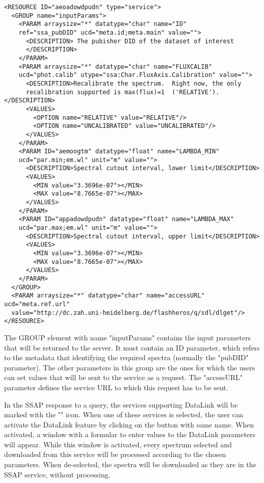 \documentclass[final,authoryear,5p,times,twocolumn]{elsarticle}
\begin{document}
\begin{itemize}
{\tiny
\begin{minipage}{\textwidth} 
\begin{verbatim}
<RESOURCE ID="aeoadowdpudn" type="service">
  <GROUP name="inputParams">
    <PARAM arraysize="*" datatype="char" name="ID" 
    ref="ssa_pubDID" ucd="meta.id;meta.main" value="">
      <DESCRIPTION> The pubisher DID of the dataset of interest
      </DESCRIPTION>
    </PARAM>
    <PARAM arraysize="*" datatype="char" name="FLUXCALIB" 
    ucd="phot.calib" utype="ssa:Char.FluxAxis.Calibration" value="">
      <DESCRIPTION>Recalibrate the spectrum.  Right now, the only 
      recalibration supported is max(flux)=1  ('RELATIVE').</DESCRIPTION>
      <VALUES>
        <OPTION name="RELATIVE" value="RELATIVE"/>
        <OPTION name="UNCALIBRATED" value="UNCALIBRATED"/>
      </VALUES>
    </PARAM>
    <PARAM ID="aemoogtm" datatype="float" name="LAMBDA_MIN"
    ucd="par.min;em.wl" unit="m" value="">
      <DESCRIPTION>Spectral cutout interval, lower limit</DESCRIPTION>
      <VALUES>
        <MIN value="3.3696e-07"></MIN>
        <MAX value="8.7665e-07"></MAX>
      </VALUES>
    </PARAM>
    <PARAM ID="appadowdpudn" datatype="float" name="LAMBDA_MAX" 
    ucd="par.max;em.wl" unit="m" value="">
      <DESCRIPTION>Spectral cutout interval, upper limit</DESCRIPTION>
      <VALUES>
        <MIN value="3.3696e-07"></MIN>
        <MAX value="8.7665e-07"></MAX>
      </VALUES>
    </PARAM>
  </GROUP>
  <PARAM arraysize="*" datatype="char" name="accessURL" ucd="meta.ref.url" 
  value="http://dc.zah.uni-heidelberg.de/flashheros/q/sdl/dlget"/>
</RESOURCE>
\end{verbatim}

\end{minipage}
}

The GROUP element with name "inputParams" contains the input
parameters that will be returned to the server.  It must contain an ID
parameter, which refers to the metadata that identifying the required
spectra (normally the "pubDID" parameter).  The other parameters in
this group are the ones for which the users can set values that will
be sent to the service as a request. The "accessURL" parameter defines
the service URL to which this request has to be sent.

In the SSAP response to a query, the services supporting DataLink will
be marked with the  ""  icon. When one of these services is
selected, the user can activate the DataLink feature by clicking on
the button with same name. When activated, a window with a formular to
enter values to the DataLink parameters will appear. While this window
is activated, every spectrum selected and downloaded from this service
will be processed according to the chosen parameters. When
de-selected, the spectra will be downloaded as they are in the SSAP
service, without processing.


\end{itemize}
\end{document}
